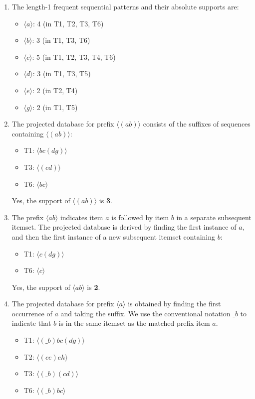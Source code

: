 \documentclass[12pt]{article}
\begin{document}
\begin{enumerate}[label=(\alph*)]
    \item
    The length-1 frequent sequential patterns and their absolute supports are:
    \begin{itemize}
        \item $\langle a \rangle$: 4 (in T1, T2, T3, T6)
        \item $\langle b \rangle$: 3 (in T1, T3, T6)
        \item $\langle c \rangle$: 5 (in T1, T2, T3, T4, T6)
        \item $\langle d \rangle$: 3 (in T1, T3, T5)
        \item $\langle e \rangle$: 2 (in T2, T4)
        \item $\langle g \rangle$: 2 (in T1, T5)
    \end{itemize}    
    \vspace{2em}
    
    \item
    The projected database for prefix $\langle(ab)\rangle$ consists of the suffixes of sequences containing $\langle(ab)\rangle$:
    \begin{itemize}
        \item T1: $\langle bc(dg) \rangle$
        \item T3: $\langle (cd) \rangle$
        \item T6: $\langle bc \rangle$
    \end{itemize}
    Yes, the support of $\langle(ab)\rangle$ is \textbf{3}.
    
    \vspace{2em}
    
    \item
    The prefix $\langle ab \rangle$ indicates item $a$ is followed by item $b$ in a separate subsequent itemset. The projected database is derived by finding the first instance of $a$, and then the first instance of a new subsequent itemset containing $b$:
    \begin{itemize}
        \item T1: $\langle c(dg) \rangle$
        \item T6: $\langle c \rangle$
    \end{itemize}
    Yes, the support of $\langle ab \rangle$ is \textbf{2}.
    
    \vspace{2em}
    
    \item
    The projected database for prefix $\langle a \rangle$ is obtained by finding the first occurrence of $a$ and taking the suffix. We use the conventional notation $\_b$ to indicate that $b$ is in the same itemset as the matched prefix item $a$.
    \begin{itemize}
        \item T1: $\langle (\_b)bc(dg) \rangle$
        \item T2: $\langle (ce)eh \rangle$
        \item T3: $\langle (\_b)(cd) \rangle$
        \item T6: $\langle (\_b)bc \rangle$
    \end{itemize}
    

\end{enumerate}
\end{document}

